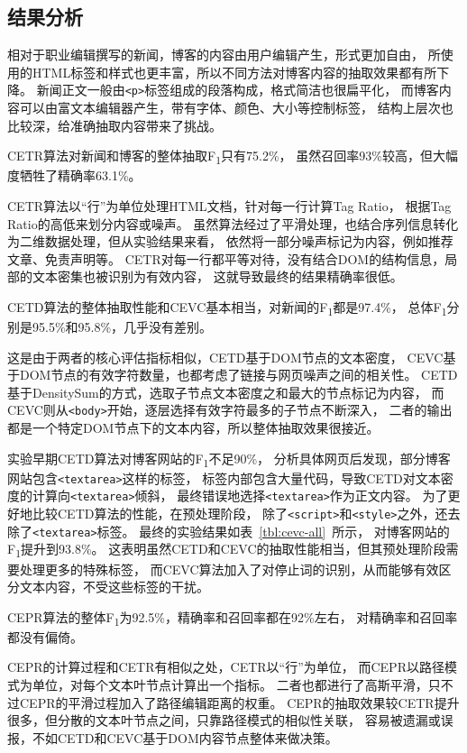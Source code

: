 \subsection{结果分析}

相对于职业编辑撰写的新闻，博客的内容由用户编辑产生，形式更加自由，
所使用的HTML标签和样式也更丰富，所以不同方法对博客内容的抽取效果都有所下降。
新闻正文一般由\texttt{<p>}标签组成的段落构成，格式简洁也很扁平化，
而博客内容可以由富文本编辑器产生，带有字体、颜色、大小等控制标签，
结构上层次也比较深，给准确抽取内容带来了挑战。

CETR算法对新闻和博客的整体抽取F\textsubscript{1}只有75.2\%，
虽然召回率93\%较高，但大幅度牺牲了精确率63.1\%。

CETR算法以“行”为单位处理HTML文档，针对每一行计算Tag Ratio，
根据Tag Ratio的高低来划分内容或噪声。
虽然算法经过了平滑处理，也结合序列信息转化为二维数据处理，但从实验结果来看，
依然将一部分噪声标记为内容，例如推荐文章、免责声明等。
CETR对每一行都平等对待，没有结合DOM的结构信息，局部的文本密集也被识别为有效内容，
这就导致最终的结果精确率很低。

CETD算法的整体抽取性能和CEVC基本相当，对新闻的F\textsubscript{1}都是97.4\%，
总体F\textsubscript{1}分别是95.5\%和95.8\%，几乎没有差别。

这是由于两者的核心评估指标相似，CETD基于DOM节点的文本密度，
CEVC基于DOM节点的有效字符数量，也都考虑了链接与网页噪声之间的相关性。
CETD基于DensitySum的方式，选取子节点文本密度之和最大的节点标记为内容，
而CEVC则从\texttt{<body>}开始，逐层选择有效字符最多的子节点不断深入，
二者的输出都是一个特定DOM节点下的文本内容，所以整体抽取效果很接近。

实验早期CETD算法对博客网站的F\textsubscript{1}不足90\%，
分析具体网页后发现，部分博客网站包含\texttt{<textarea>}这样的标签，
标签内部包含大量代码，导致CETD对文本密度的计算向\texttt{<textarea>}倾斜，
最终错误地选择\texttt{<textarea>}作为正文内容。
为了更好地比较CETD算法的性能，在预处理阶段，
除了\texttt{<script>}和\texttt{<style>}之外，还去除了\texttt{<textarea>}标签。
最终的实验结果如表~\ref{tbl:cevc-all}~所示，
对博客网站的F\textsubscript{1}提升到93.8\%。
这表明虽然CETD和CEVC的抽取性能相当，但其预处理阶段需要处理更多的特殊标签，
而CEVC算法加入了对停止词的识别，从而能够有效区分文本内容，不受这些标签的干扰。

CEPR算法的整体F\textsubscript{1}为92.5\%，精确率和召回率都在92\%左右，
对精确率和召回率都没有偏倚。

CEPR的计算过程和CETR有相似之处，CETR以“行”为单位，
而CEPR以路径模式为单位，对每个文本叶节点计算出一个指标。
二者也都进行了高斯平滑，只不过CEPR的平滑过程加入了路径编辑距离的权重。
CEPR的抽取效果较CETR提升很多，但分散的文本叶节点之间，只靠路径模式的相似性关联，
容易被遗漏或误报，不如CETD和CEVC基于DOM内容节点整体来做决策。

